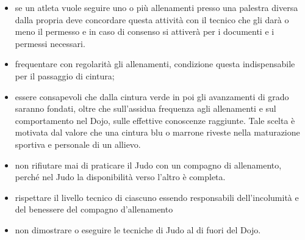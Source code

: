 \documentclass{djtsdoc}
\begin{document}
\begin{enumerate}
\begin{itemize}
			\item se un atleta vuole seguire uno o più allenamenti presso una palestra diversa dalla propria deve concordare questa attività con il tecnico che gli darà o meno il permesso e in caso di consenso si attiverà per i documenti e i permessi necessari. 
			\item frequentare con regolarità gli allenamenti, condizione questa indispensabile per il passaggio di cintura;
			\item essere consapevoli che dalla cintura verde in poi gli avanzamenti di grado saranno fondati,  oltre che sull'assidua frequenza agli allenamenti e sul comportamento nel Dojo, sulle effettive conoscenze raggiunte. Tale scelta è motivata dal valore che una cintura blu o marrone riveste nella maturazione sportiva e personale di un allievo.
			\item non rifiutare mai di praticare il Judo con un compagno di allenamento, perché nel Judo la disponibilità verso l’altro è completa. 
			\item rispettare il livello tecnico di ciascuno essendo responsabili dell’incolumità e del benessere del compagno d’allenamento
			\item non dimostrare o eseguire le tecniche di Judo al di fuori del Dojo.
		\end{itemize}
	\end{enumerate}
	
\end{document}
